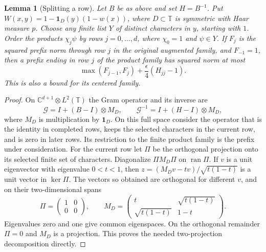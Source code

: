 \documentclass[reqno,a4paper,12pt]{amsart}
\newtheorem{lemma}[theorem]{Lemma}
\newcommand{\C}{\mathbb C}
\newcommand{\T}{\mathbb T}
\begin{document}
\begin{lemma}[Splitting a row]\label{rowsplit}
Let $B$ be as above and set $H=B^{-1}$.
Put $W(x,y)=1-\mathbf1_D(y)(1-w(x))$, where $D\subset\T$ is symmetric
with Haar measure $p$. Choose any finite list $Y$ of distinct characters
in $y$, starting with $1$. Order the products $\chi_j\psi$ by rows
$j=0,\ldots,d$, where $\chi_0=1$ and $\psi\in Y$.
If $F_j$ is the squared prefix norm through row $j$ in the original
augmented family, and $F_{-1}=1$, then a prefix ending in row $j$
of the product family has squared norm at most
\[
 \max(F_{j-1},F_j)+\frac{\epsilon}{4}(H_{jj}-1).
\]
This is also a bound for its centered family.
\end{lemma}
\begin{proof}
On $\C^{d+1}\otimes L^2(\T)$ the Gram operator and its inverse are
\begin{equation}\label{rareoperators}
 \mathcal G=I+(B-I)\otimes M_D,\qquad
 \mathcal G^{-1}=I+(H-I)\otimes M_D,
\end{equation}
where $M_D$ is multiplication by $\mathbf1_D$.
On this full space consider the operator that is the identity in
completed rows, keeps the selected characters in the current row, and
is zero in later rows. Its restriction to the finite product family is
the prefix under consideration. For the current row let $\Pi$ be the
orthogonal projection onto its selected finite set of characters.
Diagonalize $\Pi M_D\Pi$ on $\operatorname{ran}\Pi$.
If $v$ is a unit eigenvector with eigenvalue $0<t<1$, then
$z=(M_Dv-tv)/\sqrt{t(1-t)}$ is a unit vector in $\ker\Pi$.
The vectors so obtained are orthogonal for different $v$, and on their
two-dimensional spans
\[
 \Pi=\begin{pmatrix}1&0\\0&0\end{pmatrix},\qquad
 M_D=\begin{pmatrix}t&\sqrt{t(1-t)}\\\sqrt{t(1-t)}&1-t\end{pmatrix}.
\]
Eigenvalues zero and one give common eigenspaces. On the orthogonal
remainder $\Pi=0$ and $M_D$ is a projection. This proves the needed
two-projection decomposition directly.


\end{proof}
\end{document}
